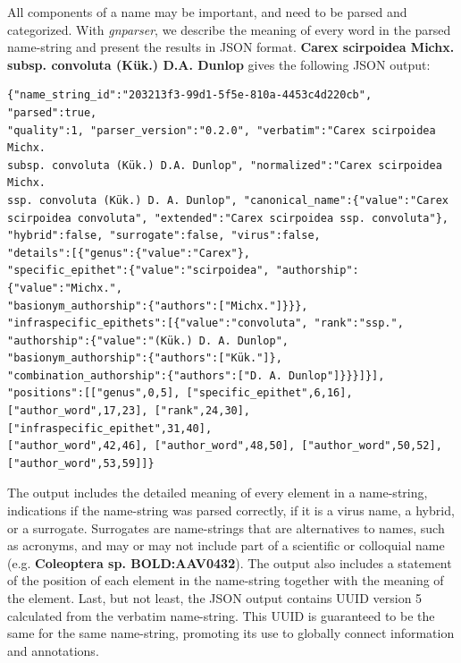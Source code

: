 \documentclass{bmcart}
\begin{document}

All components of a name may be important, and need to be parsed and
categorized. With \textit{gnparser}, we describe the meaning of every word in
the parsed name-string and present the results in JSON format.  \textbf{Carex
scirpoidea Michx.  subsp. convoluta (Kük.) D.A. Dunlop} gives the following
JSON output:

\vspace{0.5cm}

\begin{Verbatim}[fontsize=\small]
{"name_string_id":"203213f3-99d1-5f5e-810a-4453c4d220cb", "parsed":true,
"quality":1, "parser_version":"0.2.0", "verbatim":"Carex scirpoidea Michx.
subsp. convoluta (Kük.) D.A. Dunlop", "normalized":"Carex scirpoidea Michx.
ssp. convoluta (Kük.) D. A. Dunlop", "canonical_name":{"value":"Carex
scirpoidea convoluta", "extended":"Carex scirpoidea ssp. convoluta"},
"hybrid":false, "surrogate":false, "virus":false,
"details":[{"genus":{"value":"Carex"},
"specific_epithet":{"value":"scirpoidea", "authorship":{"value":"Michx.",
"basionym_authorship":{"authors":["Michx."]}}},
"infraspecific_epithets":[{"value":"convoluta", "rank":"ssp.",
"authorship":{"value":"(Kük.) D. A. Dunlop",
"basionym_authorship":{"authors":["Kük."]},
"combination_authorship":{"authors":["D. A. Dunlop"]}}}]}],
"positions":[["genus",0,5], ["specific_epithet",6,16],
["author_word",17,23], ["rank",24,30], ["infraspecific_epithet",31,40],
["author_word",42,46], ["author_word",48,50], ["author_word",50,52],
["author_word",53,59]]}
\end{Verbatim}

\vspace{0.5cm}

The output includes the detailed meaning of every element in a name-string,
indications if the name-string was parsed correctly, if it is a virus name, a
hybrid, or a surrogate. Surrogates are name-strings that are alternatives to
names, such as acronyms, and may or may not include part of a scientific or
colloquial name (e.g. \textbf{Coleoptera sp. BOLD:AAV0432}). The output also
includes a statement of the position of each element in the name-string
together with the meaning of the element.  Last, but not least, the JSON output
contains UUID version 5 calculated from the verbatim name-string. This UUID is
guaranteed to be the same for the same name-string, promoting its use to
globally connect information and annotations.
\end{document}
